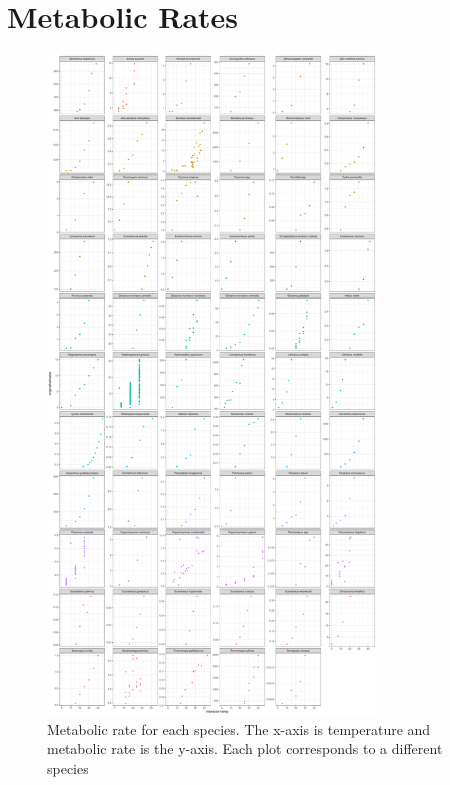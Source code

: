 \documentclass{article}
\begin{document}
\section{Metabolic Rates}
\begin{figure}[h]
    \centering
    \includegraphics[width=3.43in]{AllMRs (2).pdf}
    \caption{\label{fig:11} Metabolic rate for each species. The x-axis is temperature and metabolic rate is the y-axis. Each plot corresponds to a different species}
\end{figure}
\clearpage
\end{document}
